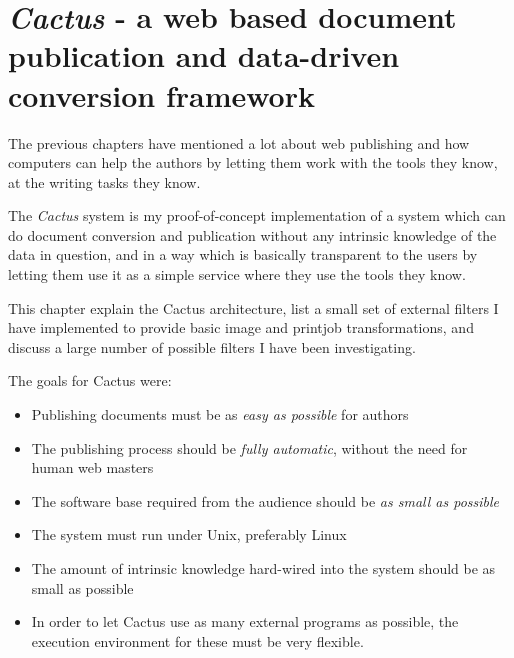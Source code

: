 



\chapter{\textit{Cactus} - a web based document publication
  and data-driven conversion framework}






The previous chapters have mentioned a lot about web
publishing and how computers can help the authors by letting
them work with the tools they know, at the writing tasks
they know.

The \textit{Cactus} system is my proof-of-concept
implementation of a system which can do document conversion
and publication without any intrinsic knowledge of the data
in question, and in a way which is basically transparent to
the users by letting them use it as a simple service where
they use the tools they know.

This chapter explain the Cactus architecture,
 list a small set
of external filters I have implemented to provide basic
image and printjob transformations, and
 discuss
a large number of possible filters I have been
investigating.

The goals for Cactus were:

\begin{itemize}
\item Publishing documents must be as \textit{easy as
    possible} for authors
  
\item The publishing process should be \textit{fully
    automatic}, without the need for human web masters
  
\item The software base required from the audience should be
  \textit{as small as possible}
  
\item The system must run under Unix, preferably Linux
  
\item The amount of intrinsic knowledge hard-wired into the
  system should be as small as possible

\item In order to let Cactus use as many external programs as
  possible, the execution environment for these must be very
  flexible. 
\end{itemize}

